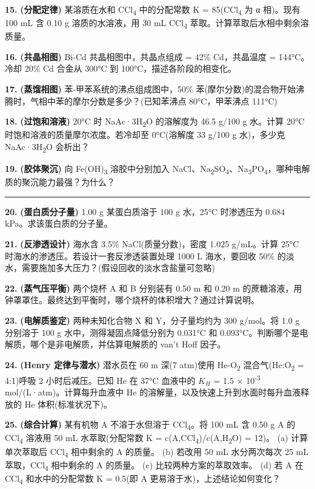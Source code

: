 \documentclass[a4paper,11pt]{ctexart}
\newcommand{\箭}{\ensuremath{\rightarrow}}
\newcommand{\左箭}{\ensuremath{\leftarrow}}
\newcommand{\上箭}{\ensuremath{\uparrow}}
\newcommand{\下箭}{\ensuremath{\downarrow}}
\newcommand{\衡}{\ensuremath{\rightleftharpoons}}
\newcommand{\双箭}{\ensuremath{\leftrightarrow}}
\newcommand{\约等于}{\ensuremath{\approx}}
\newcommand{\小于等于}{\ensuremath{\leq}}
\newcommand{\大于等于}{\ensuremath{\geq}}
\newcommand{\不等于}{\ensuremath{\neq}}
\newcommand{\西格马}{\ensuremath{\sigma}}
\newcommand{\派}{\ensuremath{\pi}}
\begin{document}
\textbf{15.} \textbf{(分配定律)} 某溶质在水和 CCl\textsubscript{4} 中的分配常数 K = 85(CCl\textsubscript{4} 为 α 相)。现有 100 mL 含 0.10 g 溶质的水溶液，用 30 mL CCl\textsubscript{4} 萃取。计算萃取后水相中剩余溶质量。

\textbf{16.} \textbf{(共晶相图)} Bi-Cd 共晶相图中，共晶点组成 = 42\% Cd，共晶温度 = 144°C。冷却 20\% Cd 合金从 300°C 到 100°C，描述各阶段的相变化。

\textbf{17.} \textbf{(蒸馏相图)} 苯-甲苯系统的沸点组成图中，50\% 苯(摩尔分数)的混合物开始沸腾时，气相中苯的摩尔分数是多少？(已知苯沸点 80°C，甲苯沸点 111°C)

\textbf{18.} \textbf{(过饱和溶液)} 20°C 时 NaAc·3H\textsubscript{2}O 的溶解度为 46.5 g/100 g 水。计算 20°C 时饱和溶液的质量摩尔浓度。若冷却至 0°C(溶解度 33 g/100 g 水)，多少克 NaAc·3H\textsubscript{2}O 会析出？

\textbf{19.} \textbf{(胶体聚沉)} 向 Fe(OH)\textsubscript{3} 溶胶中分别加入 NaCl、Na\textsubscript{2}SO\textsubscript{4}、Na\textsubscript{3}PO\textsubscript{4}，哪种电解质的聚沉能力最强？为什么？

\begin{center}\rule{0.5\linewidth}{0.5pt}\end{center}

\textbf{20.} \textbf{(蛋白质分子量)} 1.00 g 某蛋白质溶于 100 g 水，25°C 时渗透压为 0.684 kPa。求该蛋白质的分子量。

\textbf{21.} \textbf{(反渗透设计)} 海水含 3.5\% NaCl(质量分数)，密度 1.025 g/mL。计算 25°C 时海水的渗透压。若设计一套反渗透装置处理 1000 L 海水，要回收 50\% 的淡水，需要施加多大压力？(假设回收的淡水含盐量可忽略)

\textbf{22.} \textbf{(蒸气压平衡)} 两个烧杯 A 和 B 分别装有 0.50 m 和 0.20 m 的蔗糖溶液，用钟罩罩住。最终达到平衡时，哪个烧杯的体积增大？通过计算说明。

\textbf{23.} \textbf{(电解质鉴定)} 两种未知化合物 X 和 Y，分子量均约为 300 g/mol。将 1.0 g 分别溶于 100 g 水中，测得凝固点降低分别为 0.031°C 和 0.093°C。判断哪个是电解质，哪个是非电解质，并估算电解质的 van't Hoff 因子。

\textbf{24.} \textbf{(Henry 定律与潜水)} 潜水员在 60 m 深(7 atm)使用 He-O\textsubscript{2} 混合气(He:O\textsubscript{2} = 4:1)呼吸 2 小时后减压。已知 He 在 37°C 血液中的 \(K_H\) = 1.5 × 10\textsuperscript{-3} mol/(L·atm)。计算每升血液中 He 的溶解量，以及快速上升到水面时每升血液释放的 He 体积(标准状况下)。

\textbf{25.} \textbf{(综合计算)} 某有机物 A 不溶于水但溶于 CCl\textsubscript{4}。将 100 mL 含 0.50 g A 的 CCl\textsubscript{4} 溶液用 50 mL 水萃取(分配常数 K = c(A,CCl\textsubscript{4})/c(A,H\textsubscript{2}O) = 12)。
(a) 计算单次萃取后 CCl\textsubscript{4} 相中剩余的 A 的质量。
(b) 若改用 50 mL 水分两次每次 25 mL 萃取，CCl\textsubscript{4} 相中剩余的 A 的质量。
(c) 比较两种方案的萃取效率。
(d) 若 A 在 CCl\textsubscript{4} 和水中的分配常数 K = 0.5(即 A 更易溶于水)，上述结论如何变化？
\end{document}

